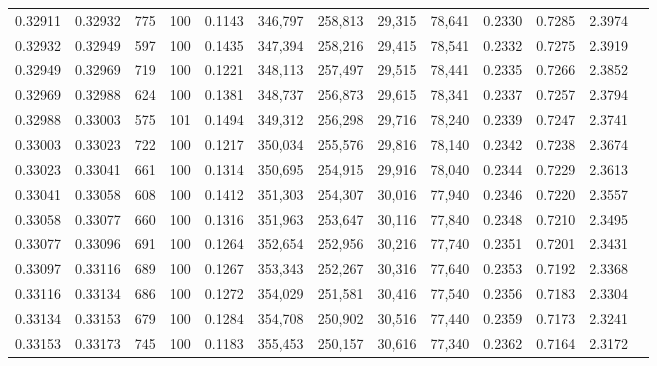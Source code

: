 \begin{tabular}{rrrrrrrrrrrrr}
0.32911 & 0.32932 &   775 & 100 &                                     0.1143 & 346,797 & 258,813 &  29,315 &  78,641 & 0.2330 & 0.7285 & 2.3974 \\
0.32932 & 0.32949 &   597 & 100 &                                     0.1435 & 347,394 & 258,216 &  29,415 &  78,541 & 0.2332 & 0.7275 & 2.3919 \\
0.32949 & 0.32969 &   719 & 100 &                                     0.1221 & 348,113 & 257,497 &  29,515 &  78,441 & 0.2335 & 0.7266 & 2.3852 \\
0.32969 & 0.32988 &   624 & 100 &                                     0.1381 & 348,737 & 256,873 &  29,615 &  78,341 & 0.2337 & 0.7257 & 2.3794 \\
0.32988 & 0.33003 &   575 & 101 &                                     0.1494 & 349,312 & 256,298 &  29,716 &  78,240 & 0.2339 & 0.7247 & 2.3741 \\
0.33003 & 0.33023 &   722 & 100 &                                     0.1217 & 350,034 & 255,576 &  29,816 &  78,140 & 0.2342 & 0.7238 & 2.3674 \\
0.33023 & 0.33041 &   661 & 100 &                                     0.1314 & 350,695 & 254,915 &  29,916 &  78,040 & 0.2344 & 0.7229 & 2.3613 \\
0.33041 & 0.33058 &   608 & 100 &                                     0.1412 & 351,303 & 254,307 &  30,016 &  77,940 & 0.2346 & 0.7220 & 2.3557 \\
0.33058 & 0.33077 &   660 & 100 &                                     0.1316 & 351,963 & 253,647 &  30,116 &  77,840 & 0.2348 & 0.7210 & 2.3495 \\
0.33077 & 0.33096 &   691 & 100 &                                     0.1264 & 352,654 & 252,956 &  30,216 &  77,740 & 0.2351 & 0.7201 & 2.3431 \\
0.33097 & 0.33116 &   689 & 100 &                                     0.1267 & 353,343 & 252,267 &  30,316 &  77,640 & 0.2353 & 0.7192 & 2.3368 \\
0.33116 & 0.33134 &   686 & 100 &                                     0.1272 & 354,029 & 251,581 &  30,416 &  77,540 & 0.2356 & 0.7183 & 2.3304 \\
0.33134 & 0.33153 &   679 & 100 &                                     0.1284 & 354,708 & 250,902 &  30,516 &  77,440 & 0.2359 & 0.7173 & 2.3241 \\
0.33153 & 0.33173 &   745 & 100 &                                     0.1183 & 355,453 & 250,157 &  30,616 &  77,340 & 0.2362 & 0.7164 & 2.3172 \\

\end{tabular}
